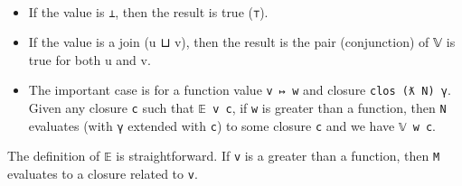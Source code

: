\begin{fence}
\begin{code}
\>[30]\AgdaSpace{}%
\AgdaSpace{}%
\AgdaSymbol{)}\<%
\\
\>[0]\AgdaSpace{}%
\AgdaSymbol{(}\AgdaSpace{}%
\AgdaSpace{}%
\AgdaSymbol{)}\AgdaSpace{}%
\AgdaSymbol{(}\AgdaSpace{}%
\AgdaSymbol{(}\AgdaSpace{}%
\AgdaSymbol{)}\AgdaSpace{}%
\AgdaSymbol{)}\AgdaSpace{}%
\AgdaSymbol{=}\AgdaSpace{}%
\AgdaSpace{}%
\AgdaSpace{}%
\AgdaSymbol{(}\AgdaSpace{}%
\AgdaSymbol{(}\AgdaSpace{}%
\AgdaSymbol{)}\AgdaSpace{}%
\AgdaSymbol{)}\AgdaSpace{}%
\AgdaSpace{}%
\AgdaSpace{}%
\AgdaSpace{}%
\AgdaSymbol{(}\AgdaSpace{}%
\AgdaSymbol{(}\AgdaSpace{}%
\AgdaSymbol{)}\AgdaSpace{}%
\AgdaSymbol{)}\<%
\end{code}
\end{fence}

\begin{itemize}
\item
  If the value is \texttt{⊥}, then the result is true (\texttt{⊤}).
\item
  If the value is a join (u ⊔ v), then the result is the pair
  (conjunction) of 𝕍 is true for both u and v.
\item
  The important case is for a function value \texttt{v\ ↦\ w} and
  closure \texttt{clos\ (ƛ\ N)\ γ}. Given any closure \texttt{c} such
  that \texttt{𝔼\ v\ c}, if \texttt{w} is greater than a function, then
  \texttt{N} evaluates (with \texttt{γ} extended with \texttt{c}) to
  some closure \texttt{c\textquotesingle{}} and we have
  \texttt{𝕍\ w\ c\textquotesingle{}}.
\end{itemize}

The definition of \texttt{𝔼} is straightforward. If \texttt{v} is a
greater than a function, then \texttt{M} evaluates to a closure related
to \texttt{v}.

\begin{fence}
\begin{code}%
\>[0]\AgdaSpace{}%
\AgdaSpace{}%
\AgdaSymbol{(}\AgdaSpace{}%
\AgdaSpace{}%
\AgdaSymbol{)}\AgdaSpace{}%
\AgdaSymbol{=}\AgdaSpace{}%
\AgdaSpace{}%
\AgdaSpace{}%
\AgdaSpace{}%
\AgdaFunction{Σ[}\AgdaSpace{}%
\AgdaSpace{}%
\AgdaSpace{}%
\AgdaSpace{}%
\AgdaFunction{]}\AgdaSpace{}%
\AgdaSpace{}%
\AgdaSpace{}%
\AgdaSpace{}%
\AgdaSpace{}%
\AgdaSpace{}%
\AgdaSpace{}%
\AgdaSpace{}%
\AgdaSpace{}%
\<%
\end{code}
\end{fence}

